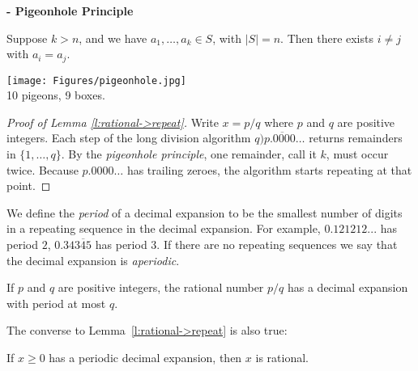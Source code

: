 \documentclass[11pt,dvipsnames]{book}
\numberwithin{figure}{section} %
\numberwithin{table}{section} %
\begin{document}
%
\noindent

\begin{definition} {\bf - Pigeonhole Principle}\\
\begin{minipage}[c]{0.4\linewidth}
Suppose $k>n$, and we have $a_1,\ldots, a_k \in S$, with $|S|=n$.  Then there exists $i\neq j$ with $a_i=a_j$.
\end{minipage}
\hspace{.2\linewidth}
\begin{minipage}[c]{0.4\linewidth}
\begin{center}
\texttt{[image: Figures/pigeonhole.jpg]}\\
10 pigeons, 9 boxes.
\end{center}
\end{minipage}
\end{definition}

\vspace{.5cm}

\begin{proof}[Proof of Lemma \ref{l:rational->repeat}]
Write $x=p/q$ where $p$ and $q$ are positive integers. Each step of the long division algorithm $q\overline{)p.0000\ldots}$ returns remainders in $\{1,\ldots, q\}$.  By the \emph{pigeonhole principle}, one remainder, call it $k$, must occur twice.  Because $p.0000\ldots$ has trailing zeroes, the algorithm starts repeating at that point.
\end{proof}

We define the {\it period} of a decimal expansion to be the smallest number of digits in a repeating sequence in the decimal expansion. For example, $0.121212...$ has period $2$, $0.34\overline{345}$ has period 3. If there are no repeating sequences we say that the decimal expansion is {\it aperiodic}.

\begin{corollary} If $p$ and $q$ are positive integers, the rational number $p/q$ has a decimal expansion with period at most $q$.\end{corollary}

The converse to Lemma~\ref{l:rational->repeat} is also true:

\begin{lemma}
If $x\geq 0$ has a periodic decimal expansion, then $x$ is rational.
\end{lemma}
\end{document}
